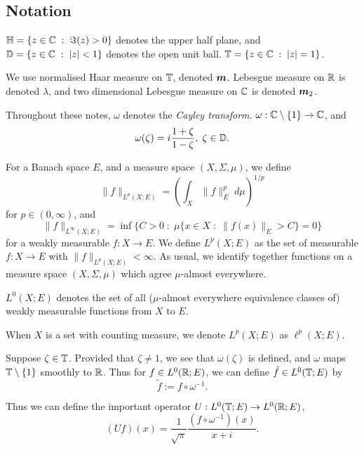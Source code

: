 \subsection{Notation}
$\mathbb{H} = \{z \in \mathbb{C}\;:\;\Im(z) > 0\}$ denotes the upper half plane,
and $\mathbb{D} = \{z\in \mathbb{C}\;:\; |z| < 1\}$ denotes the open unit ball.
$\mathbb{T} = \{z \in \mathbb{C}\;:\; |z| = 1\}$.

We use normalised Haar measure on $\mathbb{T}$, denoted $\boldsymbol{m}$. Lebesgue
measure on $\mathbb{R}$ is denoted $\lambda$, and two dimensional Lebesgue measure on
$\mathbb{C}$ is denoted $\boldsymbol{m}_2$.

Throughout these notes, $\omega$ denotes the \emph{Cayley transform}.
$\omega:\mathbb{C}\setminus\{1\}\rightarrow \mathbb{C}$, and 
\begin{equation}
    \omega(\zeta) = i\frac{1+\zeta}{1-\zeta},\;\zeta \in \mathbb{D}.
\end{equation}

For a Banach space $E$, and a measure space $(X,\Sigma,\mu)$, we define
\begin{equation}
    \|f\|_{L^p(X;E)} = \left(\int_X \|f\|_E^p \;d\mu\right)^{1/p}
\end{equation}
for $p \in (0,\infty)$, and
\begin{equation}
    \|f\|_{L^\infty(X;E)} = \inf\{C > 0 \;:\; \mu\{x \in X \;:\; \|f(x)\|_E > C\} = 0\}
\end{equation}
for a weakly measurable $f:X\rightarrow E$. We define $L^p(X;E)$ as the set
of measurable $f:X\rightarrow E$ with $\|f\|_{L^p(X;E)} < \infty$. As usual, 
we identify together functions on a measure space $(X,\Sigma,\mu)$ 
which agree $\mu$-almost everywhere.

$L^0(X;E)$ denotes the set of all ($\mu$-almost everywhere equivalence classes of)
weakly measurable functions from $X$ to $E$.

When $X$ is a set with counting measure, we denote $L^p(X;E)$ as $\ell^p(X;E)$.

Suppose $\zeta \in \mathbb{T}$. Provided that $\zeta \neq 1$, we see that $\omega(\zeta)$
is defined, and $\omega$ maps $\mathbb{T}\setminus\{1\}$ smoothly to $\mathbb{R}$. Thus for
$f \in L^0(\mathbb{R};E)$, we can define $\tilde{f} \in L^0(\mathbb{T};E)$
by 
\begin{equation}
    \tilde{f} := f\circ \omega^{-1}.
\end{equation}

Thus we can define the important operator $U:L^0(\mathbb{T};E)\rightarrow L^0(\mathbb{R};E)$,
\begin{equation}
    (U f)(x) = \frac{1}{\sqrt{\pi}}\frac{(f\circ \omega^{-1})(x)}{x+i}.
\end{equation}

